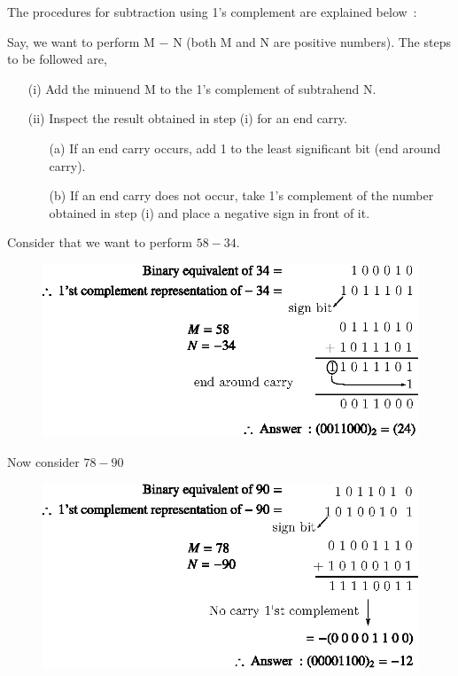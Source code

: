 
\smallskip
The procedures for subtraction using 1's complement are explained below~:

Say, we want to perform M $-$ N (both M and N are positive numbers). The steps to be followed are,
\begin{itemize}
\item[(i)] Add the minuend M to the 1's complement of subtrahend N.

\item[(ii)] Inspect the result obtained in step (i) for an end carry.
\begin{itemize}
\item[(a)] If an end carry occurs, add 1 to the least significant bit (end around carry).

\item[(b)] If an end carry does not occur, take 1's complement of the number obtained in step (i) and place a negative sign in front of it.
\end{itemize}
\end{itemize}

Consider that we want to perform $58-34$.
\begin{figure}[H]
\centering
\includegraphics{chap5/div26.eps}
\end{figure}

Now consider $78-90$
\begin{figure}[H]
\centering
\includegraphics{chap5/div27.eps}
\end{figure}

